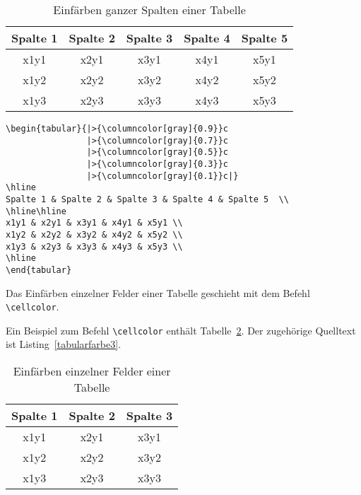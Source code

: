 \begin{table}[h!tb]
\centering
\caption{Einfärben ganzer Spalten einer Tabelle}
\label{Tabelle_Farbige_Spalten1}
\begin{tabular}{|>{\columncolor[gray]{0.9}}c
                |>{\columncolor[gray]{0.7}}c
                |>{\columncolor[gray]{0.5}}c
                |>{\columncolor[gray]{0.3}}c
                |>{\columncolor[gray]{0.1}}c|}
\hline 
Spalte 1 & Spalte 2 & Spalte 3 & Spalte 4 & Spalte 5  \\
\hline\hline
x1y1 & x2y1 & x3y1 & x4y1 & x5y1 \\
x1y2 & x2y2 & x3y2 & x4y2 & x5y2 \\
x1y3 & x2y3 & x3y3 & x4y3 & x5y3 \\
\hline
\end{tabular}
\end{table}



\begin{lstlisting}[caption={Das Einfärben ganzer Tabellenspalten ermöglicht der Befehl \texttt{columncolor}},label=tabularfarbe2, style=customlatex]
\begin{tabular}{|>{\columncolor[gray]{0.9}}c
                |>{\columncolor[gray]{0.7}}c
                |>{\columncolor[gray]{0.5}}c
                |>{\columncolor[gray]{0.3}}c
                |>{\columncolor[gray]{0.1}}c|}
\hline 
Spalte 1 & Spalte 2 & Spalte 3 & Spalte 4 & Spalte 5  \\
\hline\hline
x1y1 & x2y1 & x3y1 & x4y1 & x5y1 \\
x1y2 & x2y2 & x3y2 & x4y2 & x5y2 \\
x1y3 & x2y3 & x3y3 & x4y3 & x5y3 \\
\hline
\end{tabular}
\end{lstlisting}

Das Einfärben einzelner Felder einer Tabelle geschieht mit dem Befehl \verb!\cellcolor!.


Ein Beispiel zum Befehl \verb!\cellcolor! enthält Tabelle~\ref{Tabelle_Farbige_Zellen1}. Der zugehörige Quelltext ist Listing~\ref{tabularfarbe3}.

\begin{table}[h!tb]
\centering
\caption{Einfärben einzelner Felder einer Tabelle}
\label{Tabelle_Farbige_Zellen1}
\begin{tabular}{|c|c|c|}
\hline
Spalte 1 & Spalte 2 & Spalte 3 \\
\hline\hline
\cellcolor[gray]{0.9} x1y1 & 
\cellcolor[gray]{0.8} x2y1 & 
\cellcolor[gray]{0.7} x3y1 \\
\cellcolor[gray]{0.6} x1y2 & 
\cellcolor[gray]{0.5} x2y2 & 
\cellcolor[gray]{0.4} x3y2 \\
\cellcolor[gray]{0.3} x1y3 & 
\cellcolor[gray]{0.2} x2y3 & 
\cellcolor[gray]{0.1} x3y3 \\
\hline
\end{tabular}
\end{table}



